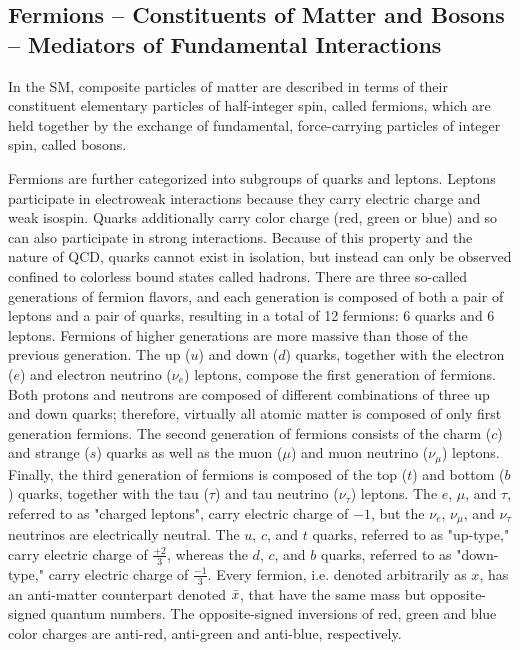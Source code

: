 \subsection{Fermions -- Constituents of Matter and Bosons -- Mediators of Fundamental Interactions}
In the SM, composite particles of matter are described in terms of their constituent elementary particles of half-integer spin, called fermions, which are held together by the exchange of fundamental, force-carrying particles of integer spin, called bosons. 

Fermions are further categorized into subgroups of quarks and leptons.
Leptons participate in electroweak interactions because they carry electric charge and weak isospin.
Quarks additionally carry color charge (red, green or blue) and so can also participate in strong interactions.
Because of this property and the nature of QCD, quarks cannot exist in isolation, but instead can only be observed confined to colorless bound states called hadrons.
There are three so-called generations of fermion flavors, and each generation is composed of both a pair of leptons and a pair of quarks, resulting in a total of 12 fermions: 6 quarks and 6 leptons.
Fermions of higher generations are more massive than those of the previous generation.
The up ($u$) and down ($d$) quarks, together with the electron ($e$) and electron neutrino ($\nu_e$) leptons, compose the first generation of fermions.
Both protons and neutrons are composed of different combinations of three up and down quarks; therefore, virtually all atomic matter is composed of only first generation fermions.
The second generation of fermions consists of the charm ($c$) and strange ($s$) quarks as well as the muon ($\mu$) and muon neutrino ($\nu_\mu$) leptons.
Finally, the third generation of fermions is composed of the top ($t$) and bottom ($b$) quarks, together with the tau ($\tau$) and tau neutrino ($\nu_\tau$) leptons.
The $e$, $\mu$, and $\tau$, referred to as "charged leptons", carry electric charge of $-1$, but the $\nu_e$, $\nu_\mu$, and $\nu_\tau$ neutrinos are electrically neutral.
The $u$, $c$, and $t$ quarks, referred to as "up-type," carry electric charge of $\frac{+2}{3}$, whereas the $d$, $c$, and $b$ quarks, referred to as "down-type," carry electric charge of $\frac{-1}{3}$.
Every fermion, i.e. denoted arbitrarily as $x$, has an anti-matter counterpart denoted $\Bar{x}$, that have the same mass but opposite-signed quantum numbers.
The opposite-signed inversions of red, green and blue color charges are anti-red, anti-green and anti-blue, respectively.

